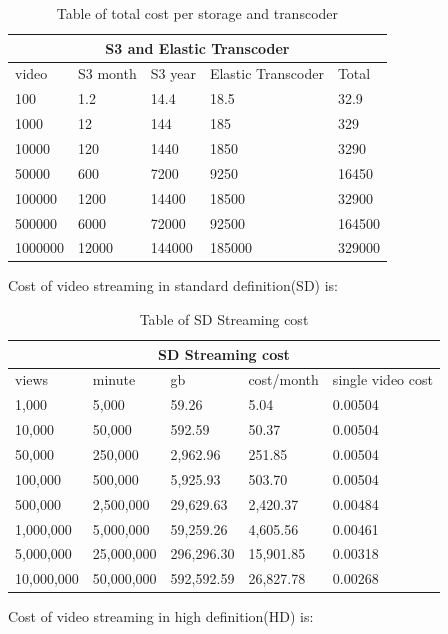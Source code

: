 \begin{table}[h!]
\begin{tabular}{ |p{2cm}|p{2cm}|p{2cm}|p{2cm}|p{2cm}| }
  \hline
  \multicolumn{5}{|c|}{S3 and Elastic Transcoder} \\
  \hline
  video & S3 month & S3 year & Elastic Transcoder & Total \\
  \hline
  100 & 1.2 & 14.4 & 18.5 & 32.9\\
  1000 & 12 & 144 & 185 & 329\\
  10000 & 120 & 1440 & 1850 & 3290\\
  50000 & 600 & 7200 & 9250 & 16450\\
  100000 & 1200 & 14400 & 18500 & 32900\\
  500000 & 6000 & 72000 & 92500 & 164500\\
  1000000 & 12000 & 144000 & 185000 & 329000\\
  \hline
\end{tabular}
\caption{Table of total cost per storage and transcoder}
\label{table:1}
\end{table}

Cost of video streaming in standard definition(SD) is:

\begin{table}[h!]
\begin{tabular}{ |p{2cm}|p{2cm}|p{2cm}|p{2cm}|p{2cm}| }
  \hline
  \multicolumn{5}{|c|}{SD Streaming cost} \\
  \hline
  views & minute & gb & cost/month & single video cost\\
  \hline
1,000 & 5,000 & 59.26 & 5.04 & 0.00504\\
10,000 & 50,000 & 592.59 & 50.37 & 0.00504\\
50,000 & 250,000 & 2,962.96 & 251.85 & 0.00504\\
100,000 & 500,000 & 5,925.93 & 503.70 & 0.00504\\
500,000 & 2,500,000 & 29,629.63 & 2,420.37 & 0.00484\\
1,000,000 & 5,000,000 & 59,259.26 & 4,605.56 & 0.00461\\
5,000,000 & 25,000,000 & 296,296.30 & 15,901.85 & 0.00318\\
10,000,000 & 50,000,000 & 592,592.59 & 26,827.78 & 0.00268\\
  \hline
\end{tabular}
\caption{Table of SD Streaming cost}
\label{table:1}
\end{table}


Cost of video streaming in high definition(HD) is:

